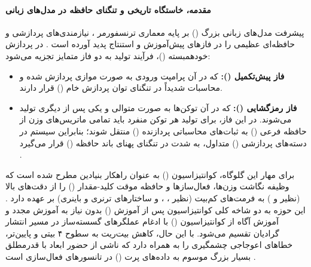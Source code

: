 \item {}

\paragraph*{مقدمه، خاستگاه تاریخی و تنگنای حافظه در مدل‌های زبانی}
پیشرفت مدل‌های زبانی بزرگ () بر پایه معماری ترنسفورمر \cite{vaswani2017attention}، نیازمندی‌های پردازشی و حافظه‌ای عظیمی را در فازهای پیش‌آموزش و استنتاج پدید آورده است \cite{gong2024survey, jorgensen2025resource}. در پردازش خودهمبسته ()، فرآیند تولید به دو فاز متمایز تجزیه می‌شود:
\begin{itemize}
    \item \textbf{فاز پیش‌تکمیل ():} که در آن پرامپت ورودی به صورت موازی پردازش شده و محاسبات شدیداً در تنگنای توان پردازش خام () قرار دارند.
    \item \textbf{فاز رمزگشایی ():} که در آن توکن‌ها به صورت متوالی و یکی پس از دیگری تولید می‌شوند. در این فاز، برای تولید هر توکن منفرد باید تمامی ماتریس‌های وزن از حافظه فرعی () به ثبات‌های محاسباتی پردازنده () منتقل شوند؛ بنابراین سیستم در دسته‌های پردازشی () متداول، به شدت در تنگنای پهنای باند حافظه () قرار می‌گیرد \cite{gong2024survey, jokar2026transforms}.
\end{itemize}

برای مهار این گلوگاه، کوانتیزاسیون () به عنوان راهکار بنیادین مطرح شده است که وظیفه نگاشت وزن‌ها، فعال‌سازها و حافظه موقت کلید-مقدار () را از دقت‌های بالا (نظیر  و ) به فرمت‌های کم‌بیت (نظیر ، ،  و ساختارهای ترنری و باینری) بر عهده دارد \cite{gong2024survey, zhao2025benchmarking}. این حوزه به دو شاخه کلی کوانتیزاسیون پس از آموزش () بدون نیاز به آموزش مجدد \cite{frantar2023gptq, zhao2025benchmarking} و آموزش آگاه از کوانتیزاسیون () با ادغام عملگرهای گسسته‌ساز در مسیر انتشار گرادیان \cite{chen2025scaling, liu2025binary} تقسیم می‌شود. با این حال، کاهش بیت‌ریت به سطوح ۴ بیتی و پایین‌تر، خطاهای اعوجاجی چشمگیری را به همراه دارد که ناشی از حضور ابعاد با قدرمطلق بسیار بزرگ موسوم به داده‌های پرت () در تانسورهای فعال‌سازی است \cite{dettmers2022llmint8, xiao2023smoothquant}.

